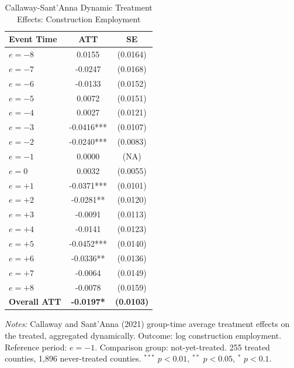 \begin{table}[htbp]
\centering
\begin{threeparttable}
\caption{Callaway-Sant'Anna Dynamic Treatment Effects: Construction Employment}
\label{tab:cs_dynamic}
\begin{tabular}{lcc}
\toprule
Event Time & ATT & SE \\
\midrule
$e = -8$ & 0.0155 & (0.0164) \\
$e = -7$ & -0.0247 & (0.0168) \\
$e = -6$ & -0.0133 & (0.0152) \\
$e = -5$ & 0.0072 & (0.0151) \\
$e = -4$ & 0.0027 & (0.0121) \\
$e = -3$ & -0.0416*** & (0.0107) \\
$e = -2$ & -0.0240*** & (0.0083) \\
$e = -1$ & 0.0000 & (NA) \\
\midrule
$e = 0$ & 0.0032 & (0.0055) \\
$e = +1$ & -0.0371*** & (0.0101) \\
$e = +2$ & -0.0281** & (0.0120) \\
$e = +3$ & -0.0091 & (0.0113) \\
$e = +4$ & -0.0141 & (0.0123) \\
$e = +5$ & -0.0452*** & (0.0140) \\
$e = +6$ & -0.0336** & (0.0136) \\
$e = +7$ & -0.0064 & (0.0149) \\
$e = +8$ & -0.0078 & (0.0159) \\
\midrule
\textbf{Overall ATT} & \textbf{-0.0197*} & \textbf{(0.0103)} \\
\bottomrule
\end{tabular}
\begin{tablenotes}[flushleft]\small
\item \textit{Notes:} Callaway and Sant'Anna (2021) group-time average treatment effects on the treated, aggregated dynamically. Outcome: log construction employment. Reference period: $e = -1$. Comparison group: not-yet-treated. 255 treated counties, 1,896 never-treated counties. $^{***}$ $p<0.01$, $^{**}$ $p<0.05$, $^{*}$ $p<0.1$.
\end{tablenotes}
\end{threeparttable}
\end{table}
